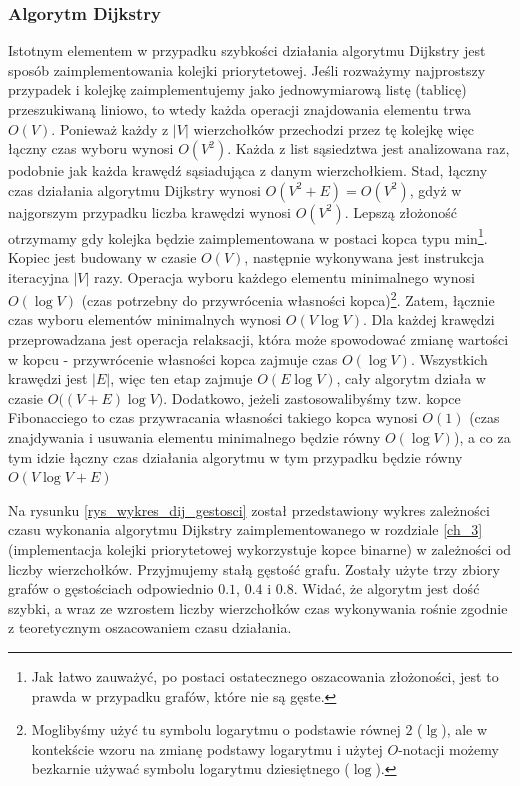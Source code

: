 \documentclass[12pt,a4paper]{book}
\theoremstyle{definition}
\numberwithin{equation}{chapter}
\begin{document}
\subsubsection*{Algorytm Dijkstry}
Istotnym elementem w przypadku szybkości działania algorytmu Dijkstry jest sposób zaimplementowania kolejki priorytetowej. Jeśli rozważymy najprostszy przypadek i kolejkę zaimplementujemy jako jednowymiarową listę (tablicę) przeszukiwaną liniowo, to wtedy każda operacji znajdowania elementu trwa $O(V)$. Ponieważ każdy z $|V|$ wierzchołków przechodzi przez tę kolejkę więc łączny czas wyboru wynosi $O(V^2)$. Każda z list sąsiedztwa jest analizowana raz, podobnie jak każda krawędź sąsiadująca z danym wierzchołkiem. Stad, łączny czas działania algorytmu Dijkstry wynosi $O(V^2 + E)=O(V^2)$, gdyż w najgorszym przypadku liczba krawędzi wynosi $O(V^2)$. Lepszą złożoność otrzymamy gdy kolejka będzie zaimplementowana w postaci kopca typu min\footnote{Jak łatwo zauważyć, po postaci ostatecznego oszacowania złożoności, jest to prawda w przypadku grafów, które nie są gęste.}. Kopiec jest budowany w czasie $O(V)$, następnie wykonywana jest instrukcja iteracyjna $|V|$ razy. Operacja wyboru każdego elementu minimalnego  wynosi $O(\log V)$ (czas potrzebny do przywrócenia własności kopca)\footnote{Moglibyśmy użyć tu symbolu logarytmu o podstawie równej $2$ ($\lg$), ale w kontekście wzoru na zmianę podstawy logarytmu i użytej $O$-notacji możemy bezkarnie używać symbolu logarytmu dziesiętnego ($\log$).}. Zatem, łącznie czas wyboru elementów minimalnych wynosi $O(V\log V)$. Dla każdej krawędzi przeprowadzana jest operacja relaksacji, która może spowodować zmianę wartości w kopcu - przywrócenie własności kopca zajmuje czas  $O(\log V)$. Wszystkich krawędzi jest $|E|$, więc ten etap zajmuje $O(E\log V)$, cały algorytm działa w czasie $O\big((V+E)\log V\big)$. Dodatkowo, jeżeli zastosowalibyśmy tzw. kopce Fibonacciego to czas przywracania własności takiego kopca wynosi $O(1)$ (czas znajdywania i usuwania elementu minimalnego będzie równy $O(\log V)$), a co za tym idzie łączny czas działania algorytmu w tym przypadku będzie równy $O(V\log V + E)$

Na rysunku \ref{rys_wykres_dij_gestosci} został przedstawiony wykres zależności czasu wykonania algorytmu Dijkstry zaimplementowanego w rozdziale \ref{ch_3} (implementacja kolejki priorytetowej wykorzystuje kopce binarne) w zależności od liczby wierzchołków. Przyjmujemy stałą gęstość grafu. Zostały użyte trzy zbiory grafów o gęstościach odpowiednio $0.1$, $0.4$ i $0.8$. Widać, że algorytm jest dość szybki, a wraz ze wzrostem liczby wierzchołków czas wykonywania rośnie zgodnie z teoretycznym oszacowaniem czasu działania.
\end{document}
